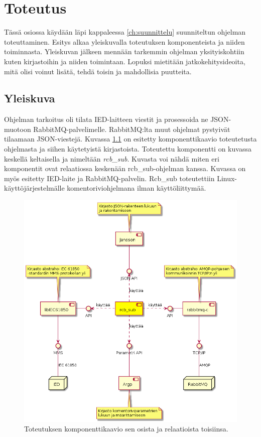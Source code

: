 \chapter{Toteutus}
\label{ch:toteutus}
Tässä osiossa käydään läpi kappaleessa \ref{ch:suunnittelu} suunniteltun ohjelman toteuttaminen. Esitys alkaa yleiskuvalla toteutuksen komponenteista ja niiden toiminnasta. Yleiskuvan jälkeen mennään tarkemmin ohjelman yksityiskohtiin kuten kirjastoihin ja niiden toimintaan. Lopuksi mietitään jatkokehitysideoita, mitä olisi voinut lisätä, tehdä toisin ja mahdollisia puutteita.


\section{Yleiskuva}
\label{ch:rcb-sub-yleiskuva}
Ohjelman tarkoitus oli tilata IED-laitteen viestit ja prosessoida ne JSON-muotoon RabbitMQ-palvelimelle. RabbitMQ:lta muut ohjelmat pystyivät tilaamaan JSON-viestejä. Kuvassa \ref{fig:rcb-sub-komponenttikaavio} on esitetty komponenttikaavio  toteutetusta ohjelmasta ja siihen käytetyistä kirjastoista. Toteutettu komponentti on kuvassa keskellä keltaisella ja nimeltään \emph{rcb\_sub}. Kuvasta voi nähdä miten eri komponentit ovat relaatiossa keskenään rcb\_sub-ohjelman kanssa. Kuvassa on myös esitetty IED-laite ja RabbitMQ-palvelin. Rcb\_sub toteutettiin Linux-käyttöjärjestelmälle komentoriviohjelmana ilman käyttöliittymää.

\begin{figure}[ht!]
	\includegraphics[width=1\textwidth]{pictures/rcb-sub-component-diagram.png}
	\caption{Toteutuksen komponenttikaavio sen osista ja relaatioista toisiinsa.}
	\label{fig:rcb-sub-komponenttikaavio}
\end{figure}


